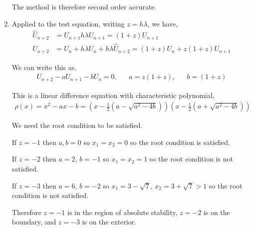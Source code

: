\documentclass[10pt]{article}
\begin{document}
\begin{solution}[Solution]
\begin{enumerate}[label=(\alph*)]
        The method is therefore second order accurate.



        


    \item Applied to the test equation, writing \( z = h \lambda \), we have,
        \begin{align*}
            \hat{U}_{n+2} &= U_{n+1} h \lambda U_{n+1} = (1+z) U_{n+1}
            \\U_{n+2} &= U_n + h \lambda U_n + h \lambda \hat{U}_{n+2}
            = (1+z) U_n + z(1+z) U_{n+1}
        \end{align*}
        
        We can write this as,
        \begin{align*}
            U_{n+2} - a U_{n+1} - bU_n = 0, && a = z(1+z), && b = (1+z)
        \end{align*}
        
        This is a linear difference equation with characteristic polynomial,
        \begin{align*}
            \rho(x) = x^2 - ax - b = \left( x-\frac{1}{2} \left( a - \sqrt{a^2-4b} \right) \right)\left( x-\frac{1}{2} \left( a + \sqrt{a^2-4b} \right) \right)
        \end{align*}

        We need the root condition to be satisfied.

        If \( z = -1 \) then \( a,b = 0 \) so \( x_1 = x_2 = 0  \) so the root condition is satisfied.

        If \( z = -2 \) then \( a = 2 \), \( b = -1 \) so \( x_1=x_2=1 \) so the root condition is not satisfied.

        If \( z = -3 \) then \( a = 6 \), \( b = -2 \) so \( x_1=3-\sqrt{7} \), \( x_2 = 3+\sqrt{7} > 1 \) so the root condition is not satisfied.

        Therefore \( z=-1 \) is in the region of absolute stability, \( z=-2 \) is on the boundary, and \( z=-3 \) is on the exterior.

\end{enumerate}
\end{solution}
\end{document}
